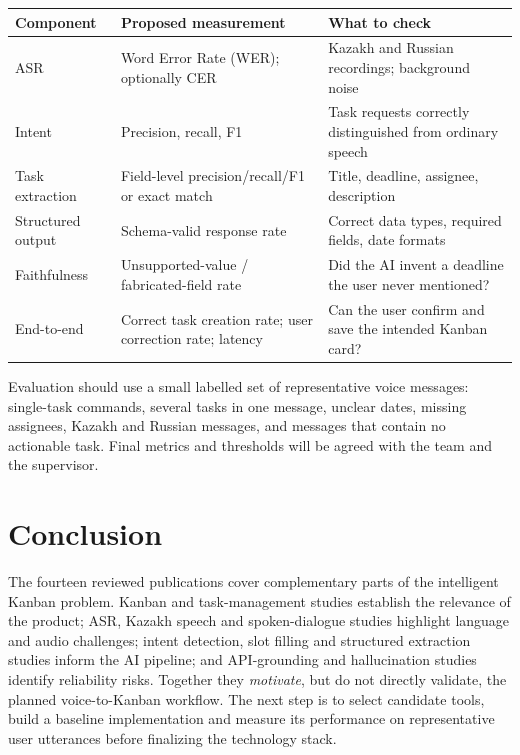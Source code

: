 \documentclass[11pt,a4paper]{article}
\begin{document}
\begingroup
\small
{}
\begin{tabularx}{\textwidth}{>{\raggedright\arraybackslash}p{2.6cm} >{\raggedright\arraybackslash}X >{\raggedright\arraybackslash}X}
\toprule
\textbf{Component} & \textbf{Proposed measurement} & \textbf{What to check} \\
\midrule
ASR & Word Error Rate (WER); optionally CER & Kazakh and Russian recordings; background noise \\
Intent & Precision, recall, F1 & Task requests correctly distinguished from ordinary speech \\
Task extraction & Field-level precision/recall/F1 or exact match & Title, deadline, assignee, description \\
Structured output & Schema-valid response rate & Correct data types, required fields, date formats \\
Faithfulness & Unsupported-value / fabricated-field rate & Did the AI invent a deadline the user never mentioned? \\
End-to-end & Correct task creation rate; user correction rate; latency & Can the user confirm and save the intended Kanban card? \\
\bottomrule
\end{tabularx}
\endgroup

\medskip
Evaluation should use a small labelled set of representative voice messages: single-task commands, several tasks in one message, unclear dates, missing assignees, Kazakh and Russian messages, and messages that contain no actionable task. Final metrics and thresholds will be agreed with the team and the supervisor.

\section{Conclusion}

The fourteen reviewed publications cover complementary parts of the intelligent Kanban problem. Kanban and task-management studies establish the relevance of the product; ASR, Kazakh speech and spoken-dialogue studies highlight language and audio challenges; intent detection, slot filling and structured extraction studies inform the AI pipeline; and API-grounding and hallucination studies identify reliability risks. Together they \emph{motivate}, but do not directly validate, the planned voice-to-Kanban workflow. The next step is to select candidate tools, build a baseline implementation and measure its performance on representative user utterances before finalizing the technology stack.



\end{document}
